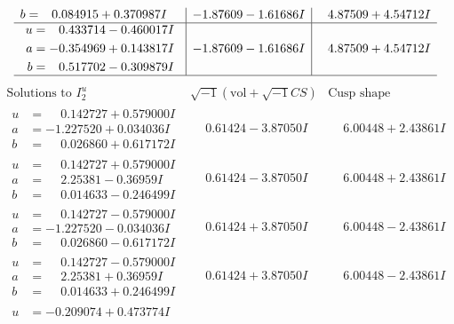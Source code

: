 \documentclass[1p]{elsarticle_modified}
\theoremstyle{definition}
\newcommand{\I}{\sqrt{-1}}
\begin{document}
$$\begin{array}{c|c|c}
\begin{aligned}
b &= \phantom{-}0.084915 + 0.370987 I\end{aligned}
 & -1.87609 - 1.61686 I & \phantom{-}4.87509 + 4.54712 I \\ \hline\begin{aligned}
u &= \phantom{-}0.433714 - 0.460017 I \\
a &= -0.354969 + 0.143817 I \\
b &= \phantom{-}0.517702 - 0.309879 I\end{aligned}
 & -1.87609 - 1.61686 I & \phantom{-}4.87509 + 4.54712 I\\
 \hline 
 \end{array}$$\newpage$$\begin{array}{c|c|c}  
\text{Solutions to }I^u_{2}& \I (\text{vol} + \sqrt{-1}CS) & \text{Cusp shape}\\
 \hline 
\begin{aligned}
u &= \phantom{-}0.142727 + 0.579000 I \\
a &= -1.227520 + 0.034036 I \\
b &= \phantom{-}0.026860 + 0.617172 I\end{aligned}
 & \phantom{-}0.61424 - 3.87050 I & \phantom{-}6.00448 + 2.43861 I \\ \hline\begin{aligned}
u &= \phantom{-}0.142727 + 0.579000 I \\
a &= \phantom{-}2.25381 - 0.36959 I \\
b &= \phantom{-}0.014633 - 0.246499 I\end{aligned}
 & \phantom{-}0.61424 - 3.87050 I & \phantom{-}6.00448 + 2.43861 I \\ \hline\begin{aligned}
u &= \phantom{-}0.142727 - 0.579000 I \\
a &= -1.227520 - 0.034036 I \\
b &= \phantom{-}0.026860 - 0.617172 I\end{aligned}
 & \phantom{-}0.61424 + 3.87050 I & \phantom{-}6.00448 - 2.43861 I \\ \hline\begin{aligned}
u &= \phantom{-}0.142727 - 0.579000 I \\
a &= \phantom{-}2.25381 + 0.36959 I \\
b &= \phantom{-}0.014633 + 0.246499 I\end{aligned}
 & \phantom{-}0.61424 + 3.87050 I & \phantom{-}6.00448 - 2.43861 I \\ \hline\begin{aligned}
u &= -0.209074 + 0.473774 I \\

\end{aligned}
\end{array}$$
\end{document}
